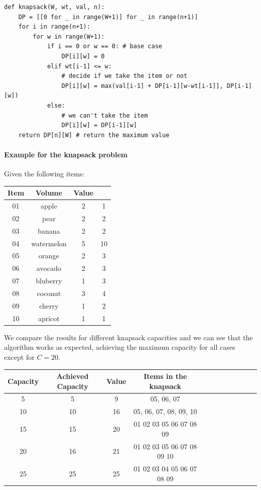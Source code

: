 \begin{lstlisting}
def knapsack(W, wt, val, n):
    DP = [[0 for _ in range(W+1)] for _ in range(n+1)]
    for i in range(n+1):
        for w in range(W+1):
            if i == 0 or w == 0: # base case
                DP[i][w] = 0
            elif wt[i-1] <= w:
                # decide if we take the item or not
                DP[i][w] = max(val[i-1] + DP[i-1][w-wt[i-1]], DP[i-1][w])
            else:
                # we can't take the item
                DP[i][w] = DP[i-1][w]
    return DP[n][W] # return the maximum value
\end{lstlisting}

\paragraph*{Example for the knapsack problem}
Given the following items:
\begin{table}[H]
    \centering
    \begin{tabular}{c|c|c|c|}
        Item & Volume     & Value      \\ \hline
        01   & apple      & 2     & 1  \\
        02   & pear       & 2     & 2  \\
        03   & banana     & 2     & 2  \\
        04   & watermelon & 5     & 10 \\
        05   & orange     & 2     & 3  \\
        06   & avocado    & 2     & 3  \\
        07   & bluberry   & 1     & 3  \\
        08   & coconut    & 3     & 4  \\
        09   & cherry     & 1     & 2  \\
        10   & apricot    & 1     & 1  \\
        \hline
    \end{tabular}
\end{table}

We compare the results for different knapsack capacities and we can see that the algorithm works as expected, achieving the maximum capacity for all cases except for $C=20$.
\begin{table}[H]
    \centering
    \begin{tabular}{c|c|c|c|c|c|c|c|c|c|c|c|}
        Capacity & Achieved Capacity & Value & Items in the knapsack       \\ \hline
        5        & 5                 & 9     & 05, 06, 07                  \\
        10       & 10                & 16    & 05, 06, 07, 08, 09, 10      \\
        15       & 15                & 20    & 01 02 03 05 06 07 08 09     \\
        20       & 16                & 21    & 01 02 03 05 06 07 08 09 10  \\
        25       & 25                & 25    & 01 02 03 04  05 06 07 08 09 \\
    \end{tabular}
\end{table}